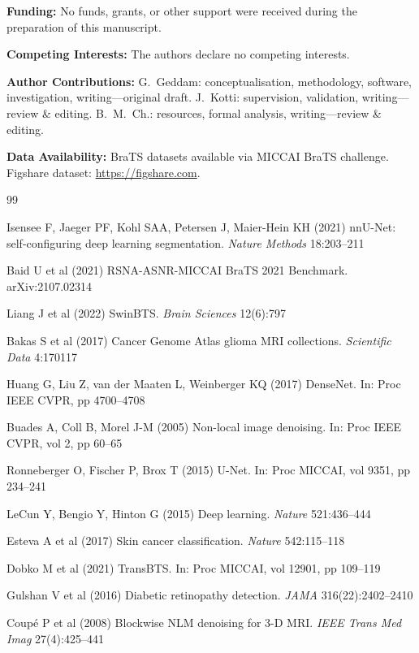 \documentclass[sn-mathphys-num]{sn-jnl}
\begin{document}
\textbf{Funding:} No funds, grants, or other support were received during the
preparation of this manuscript.

\textbf{Competing Interests:} The authors declare no competing interests.

\textbf{Author Contributions:} G.~Geddam: conceptualisation, methodology, software,
investigation, writing---original draft. J.~Kotti: supervision, validation,
writing---review \& editing. B.~M.~Ch.: resources, formal analysis,
writing---review \& editing.

\textbf{Data Availability:} BraTS datasets available via MICCAI BraTS challenge.
Figshare dataset: \url{https://figshare.com}.

\begin{thebibliography}{99}

Isensee F, Jaeger PF, Kohl SAA, Petersen J, Maier-Hein KH (2021)
nnU-Net: self-configuring deep learning segmentation.
\textit{Nature Methods} 18:203--211

Baid U et al (2021) RSNA-ASNR-MICCAI BraTS 2021 Benchmark.
arXiv:2107.02314

Liang J et al (2022) SwinBTS.
\textit{Brain Sciences} 12(6):797

Bakas S et al (2017) Cancer Genome Atlas glioma MRI collections.
\textit{Scientific Data} 4:170117

Huang G, Liu Z, van der Maaten L, Weinberger KQ (2017) DenseNet.
In: Proc IEEE CVPR, pp 4700--4708

Buades A, Coll B, Morel J-M (2005) Non-local image denoising.
In: Proc IEEE CVPR, vol 2, pp 60--65

Ronneberger O, Fischer P, Brox T (2015) U-Net.
In: Proc MICCAI, vol 9351, pp 234--241

LeCun Y, Bengio Y, Hinton G (2015) Deep learning.
\textit{Nature} 521:436--444

Esteva A et al (2017) Skin cancer classification.
\textit{Nature} 542:115--118

Dobko M et al (2021) TransBTS.
In: Proc MICCAI, vol 12901, pp 109--119

Gulshan V et al (2016) Diabetic retinopathy detection.
\textit{JAMA} 316(22):2402--2410

Coup\'{e} P et al (2008) Blockwise NLM denoising for 3-D MRI.
\textit{IEEE Trans Med Imag} 27(4):425--441


\end{thebibliography}
\end{document}
